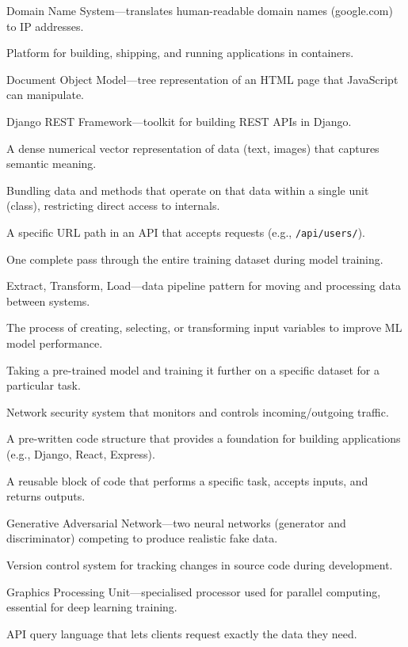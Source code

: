 \documentclass[12pt, a4paper, oneside]{book}
\begin{document}
\begin{description}[leftmargin=2em, style=nextline]
    \item[DNS] Domain Name System---translates human-readable domain names (google.com) to IP addresses.
    \item[Docker] Platform for building, shipping, and running applications in containers.
    \item[DOM] Document Object Model---tree representation of an HTML page that JavaScript can manipulate.
    \item[DRF] Django REST Framework---toolkit for building REST APIs in Django.
    \item[Embedding] A dense numerical vector representation of data (text, images) that captures semantic meaning.
    \item[Encapsulation] Bundling data and methods that operate on that data within a single unit (class), restricting direct access to internals.
    \item[Endpoint] A specific URL path in an API that accepts requests (e.g., \texttt{/api/users/}).
    \item[Epoch] One complete pass through the entire training dataset during model training.
    \item[ETL] Extract, Transform, Load---data pipeline pattern for moving and processing data between systems.
    \item[Feature Engineering] The process of creating, selecting, or transforming input variables to improve ML model performance.
    \item[Fine-tuning] Taking a pre-trained model and training it further on a specific dataset for a particular task.
    \item[Firewall] Network security system that monitors and controls incoming/outgoing traffic.
    \item[Framework] A pre-written code structure that provides a foundation for building applications (e.g., Django, React, Express).
    \item[Function] A reusable block of code that performs a specific task, accepts inputs, and returns outputs.
    \item[GAN] Generative Adversarial Network---two neural networks (generator and discriminator) competing to produce realistic fake data.
    \item[Git] Version control system for tracking changes in source code during development.
    \item[GPU] Graphics Processing Unit---specialised processor used for parallel computing, essential for deep learning training.
    \item[GraphQL] API query language that lets clients request exactly the data they need.

\end{description}
\end{document}
